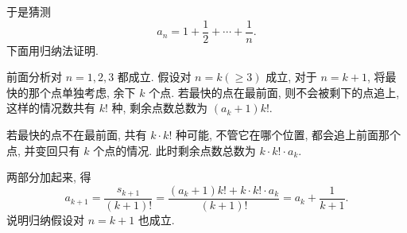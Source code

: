于是猜测 $$a_n = 1 + \dfrac{1}{2} + \cdots + \dfrac{1}{n}.$$ 
下面用归纳法证明. 

前面分析对 $n=1,2,3$ 都成立. 假设对 $n = k (\ge 3)$ 成立, 对于 $n = k+1$, 将最快的那个点单独考虑, 余下 $k$ 个点. 若最快的点在最前面, 则不会被剩下的点追上, 这样的情况数共有 $k!$ 种, 剩余点数总数为 $(a_k+1)k!$. 

若最快的点不在最前面, 共有 $k\cdot k!$ 种可能, 不管它在哪个位置, 都会追上前面那个点, 并变回只有 $k$ 个点的情况. 此时剩余点数总数为 $k\cdot k!\cdot a_k$. 

两部分加起来, 得
\[a_{k+1} = \frac{s_{k+1}}{(k+1)!} = \frac{(a_k+1)k! + k\cdot k!\cdot a_k}{(k+1)!} = a_k + \frac{1}{k+1} .\]
说明归纳假设对 $n = k+1$ 也成立.




















